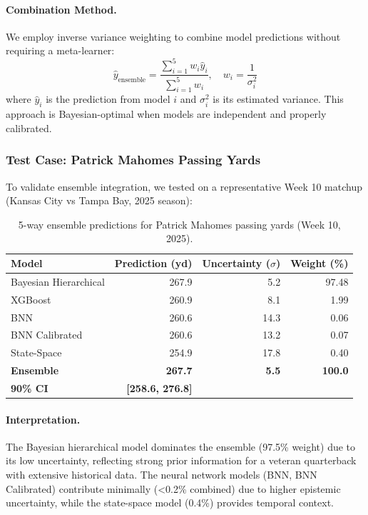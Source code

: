 \paragraph{Combination Method.}
We employ inverse variance weighting to combine model predictions without requiring a meta-learner:
\begin{equation}
\hat{y}_{\text{ensemble}} = \frac{\sum_{i=1}^{5} w_i \hat{y}_i}{\sum_{i=1}^{5} w_i}, \quad w_i = \frac{1}{\sigma_i^2}
\end{equation}
where $\hat{y}_i$ is the prediction from model $i$ and $\sigma_i^2$ is its estimated variance. This approach is Bayesian-optimal when models are independent and properly calibrated.

\subsubsection{Test Case: Patrick Mahomes Passing Yards}

To validate ensemble integration, we tested on a representative Week 10 matchup (Kansas City vs Tampa Bay, 2025 season):

\begin{table}[h]
  \centering
  \small
  \caption{5-way ensemble predictions for Patrick Mahomes passing yards (Week 10, 2025).}
  \label{tab:5way-ensemble-test}
  \begin{tabular}{@{} l r r r @{}}
    \toprule
    \textbf{Model} & \textbf{Prediction (yd)} & \textbf{Uncertainty ($\sigma$)} & \textbf{Weight (\%)} \\
    \midrule
    Bayesian Hierarchical & 267.9 & 5.2 & 97.48 \\
    XGBoost & 260.9 & 8.1 & 1.99 \\
    BNN & 260.6 & 14.3 & 0.06 \\
    BNN Calibrated & 260.6 & 13.2 & 0.07 \\
    State-Space & 254.9 & 17.8 & 0.40 \\
    \midrule
    \textbf{Ensemble} & \textbf{267.7} & \textbf{5.5} & \textbf{100.0} \\
    \textbf{90\% CI} & \textbf{[258.6, 276.8]} & & \\
    \bottomrule
  \end{tabular}
\end{table}

\paragraph{Interpretation.}
The Bayesian hierarchical model dominates the ensemble (97.5\% weight) due to its low uncertainty, reflecting strong prior information for a veteran quarterback with extensive historical data. The neural network models (BNN, BNN Calibrated) contribute minimally (<0.2\% combined) due to higher epistemic uncertainty, while the state-space model (0.4\%) provides temporal context.

